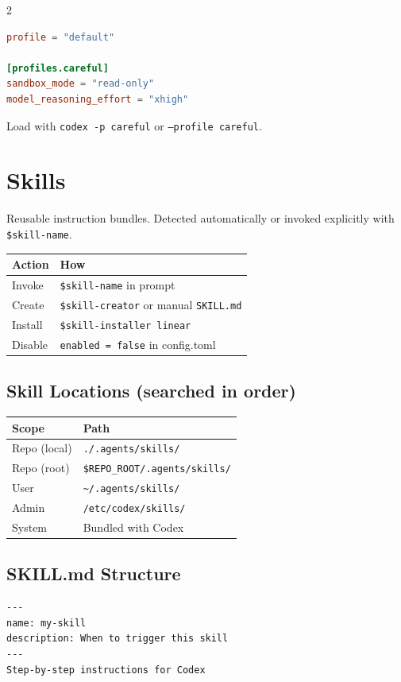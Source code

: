 \documentclass[a4paper, 9pt]{scrartcl}
\makeatletter
\newcommand{\cmdtable}[1]{%
  \smallskip
  \begin{tabularx}{\columnwidth}{@{}lX@{}}
  \toprule
  #1
  \bottomrule
  \end{tabularx}
  \smallskip
}
\makeatother
\begin{document}
\begin{multicols}{2}
\begin{lstlisting}[language=toml]
profile = "default"

[profiles.careful]
sandbox_mode = "read-only"
model_reasoning_effort = "xhigh"
\end{lstlisting}

Load with \texttt{codex -p careful} or \texttt{--profile careful}.

\section{Skills}

Reusable instruction bundles. Detected automatically or invoked explicitly with \texttt{\$skill-name}.

\cmdtable{
\textbf{Action} & \textbf{How} \\
\midrule
Invoke & \texttt{\$skill-name} in prompt \\
\midrule
Create & \texttt{\$skill-creator} or manual \texttt{SKILL.md} \\
\midrule
Install & \texttt{\$skill-installer linear} \\
\midrule
Disable & \texttt{enabled = false} in config.toml \\
}

\subsection{Skill Locations (searched in order)}

\cmdtable{
\textbf{Scope} & \textbf{Path} \\
\midrule
Repo (local) & \texttt{./.agents/skills/} \\
\midrule
Repo (root) & \texttt{\$REPO\_ROOT/.agents/skills/} \\
\midrule
User & \texttt{\textasciitilde/.agents/skills/} \\
\midrule
Admin & \texttt{/etc/codex/skills/} \\
\midrule
System & Bundled with Codex \\
}

\subsection{SKILL.md Structure}

\begin{lstlisting}
---
name: my-skill
description: When to trigger this skill
---
Step-by-step instructions for Codex
\end{lstlisting}


\end{multicols}
\end{document}
